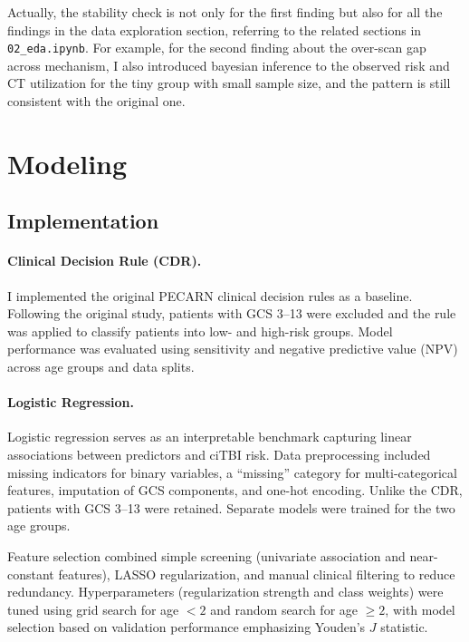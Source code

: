 \documentclass[10pt,letterpaper]{article}
\begin{document}
Actually, the stability check is not only for the first finding but also for all the findings in the data exploration section, referring to the related sections in \texttt{02\_eda.ipynb}. For example, for the second finding about the over-scan gap across mechanism, I also introduced bayesian inference to the observed risk and CT utilization for the tiny group with small sample size, and the pattern is still consistent with the original one.



\section{Modeling}

\subsection{Implementation}

\paragraph{Clinical Decision Rule (CDR).}
I implemented the original PECARN clinical decision rules as a baseline.
Following the original study, patients with GCS 3--13 were excluded and the rule was applied to classify patients into low- and high-risk groups. Model performance was evaluated using sensitivity and negative predictive value (NPV) across age groups and data splits.

\paragraph{Logistic Regression.}
Logistic regression serves as an interpretable benchmark capturing linear associations between predictors and ciTBI risk. Data preprocessing included missing indicators for binary variables, a ``missing'' category for multi-categorical features, imputation of GCS components, and one-hot encoding. Unlike the CDR, patients with GCS 3--13 were retained. Separate models were trained for the two age groups.

Feature selection combined simple screening (univariate association and near-constant features), LASSO regularization, and manual clinical filtering to reduce redundancy. Hyperparameters (regularization strength and class weights) were tuned using grid search for age $<2$ and random search for age $\geq2$, with model selection based on validation performance emphasizing Youden’s $J$ statistic.
\end{document}
